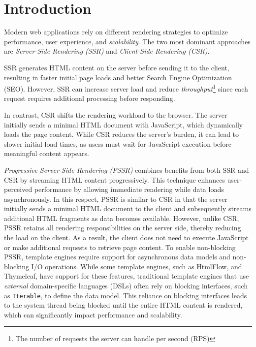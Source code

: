 \section{Introduction}


Modern web applications rely on different rendering strategies to optimize
performance, user experience, and \textit{scalability}. The two most dominant
approaches are \textit{Server-Side Rendering (SSR)} and \textit{Client-Side
    Rendering (CSR)}.

SSR generates HTML content on the server before sending it to the client,
resulting in faster initial page loads and better Search Engine Optimization
(SEO). However, SSR can increase server load and reduce
\textit{throughput}\footnote{The number of requests the server can handle per
    second (RPS)} since each request requires additional processing before
responding.

In contrast, CSR shifts the rendering workload to the browser. The server
initially sends a minimal HTML document with JavaScript, which dynamically
loads the page content. While CSR reduces the server’s burden, it can lead to
slower initial load times, as users must wait for JavaScript execution before
meaningful content appears.

\textit{Progressive Server-Side Rendering (PSSR)} combines benefits from both SSR and CSR
by streaming HTML content progressively. This technique enhances user-perceived performance by
allowing immediate rendering while data loads asynchronously. In this respect,
PSSR is similar to CSR in that the server initially sends a minimal HTML
document to the client and subsequently streams additional HTML fragments as data becomes available.
However, unlike CSR, PSSR retains all rendering responsibilities on the server side,
thereby reducing the load on the client. As a result, the client does
not need to execute JavaScript or make additional requests to retrieve page content.
To enable non-blocking PSSR, template engines require support for asynchronous
data models and non-blocking I/O operations. While some template engines, such
as HtmlFlow, and Thymeleaf, have support for these features, traditional
template engines that use \textit{external} domain-specific languages (DSLs)
often rely on blocking interfaces, such as \texttt{Iterable}, to define the
data model. This reliance on blocking interfaces leads to the system thread
being blocked until the entire HTML content is rendered, which can
significantly impact performance and scalability.

